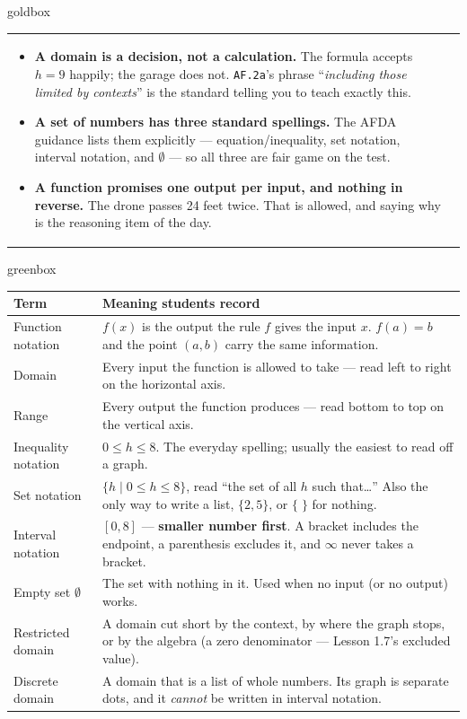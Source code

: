 \documentclass[10pt]{article}
\begin{document}
\begin{skillbox}{goldbox}
\begin{tabularx}{\linewidth}{@{}X|X@{}}
\begin{minipage}[t]{\linewidth}
\begin{itemize}[leftmargin=1.1em, itemsep=2pt, topsep=2pt]
        stalled on ``solve $f(x)=1$'' in the Lesson 2.0 diagnostic are stalling here.
  \item \textbf{A domain is a decision, not a calculation.} The formula accepts $h=9$ happily; the
        garage does not. \texttt{AF.2a}'s phrase ``\emph{including those limited by contexts}'' is
        the standard telling you to teach exactly this.
  \item \textbf{A set of numbers has three standard spellings.} The AFDA guidance lists them
        explicitly --- equation/inequality, set notation, interval notation, and $\emptyset$ ---
        so all three are fair game on the test.
  \item \textbf{A function promises one output per input, and nothing in reverse.} The drone
        passes 24 feet twice. That is allowed, and saying why is the reasoning item of the day.
\end{itemize}
\end{minipage}
\end{tabularx}
\end{skillbox}

\begin{skillbox}{greenbox}
\renewcommand{\arraystretch}{1.35}
\begin{tabularx}{\linewidth}{@{}p{3.6cm}X@{}}
\textbf{Term} & \textbf{Meaning students record} \\
\hline
Function notation & $f(x)$ is the output the rule $f$ gives the input $x$. $f(a)=b$ and the point
    $(a,b)$ carry the same information. \\
Domain & Every input the function is allowed to take --- read left to right on the horizontal
    axis. \\
Range & Every output the function produces --- read bottom to top on the vertical axis. \\
Inequality notation & $0 \le h \le 8$. The everyday spelling; usually the easiest to read off a
    graph. \\
Set notation & $\{h \mid 0 \le h \le 8\}$, read ``the set of all $h$ such that\dots'' Also the
    only way to write a list, $\{2,5\}$, or $\{\;\}$ for nothing. \\
Interval notation & $[0,8]$ --- \textbf{smaller number first}. A bracket includes the endpoint, a
    parenthesis excludes it, and $\infty$ never takes a bracket. \\
Empty set $\emptyset$ & The set with nothing in it. Used when no input (or no output) works. \\
Restricted domain & A domain cut short by the context, by where the graph stops, or by the
    algebra (a zero denominator --- Lesson 1.7's excluded value). \\
Discrete domain & A domain that is a list of whole numbers. Its graph is separate dots, and it
    \emph{cannot} be written in interval notation. \\
\end{tabularx}
\end{skillbox}
\end{document}
